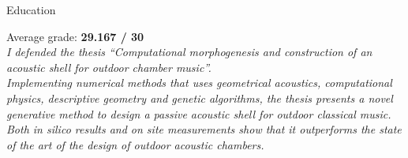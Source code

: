 \documentclass{resume}
\begin{document}
\begin{rSection}{Education}
\begin{enumerate}[leftmargin=0.45cm, itemsep=1em, topsep=0.5em, parsep=0.2em]
        Average grade: \textbf{29.167 / 30}
        \vspace{0.5em} \\
        \textit{I defended the thesis “Computational morphogenesis and construction of an acoustic shell for outdoor chamber music”. \\Implementing numerical methods that uses geometrical acoustics, computational physics, descriptive geometry and genetic algorithms, the thesis presents a novel generative method to design a passive acoustic shell for outdoor classical music. Both in silico results and on site measurements show that it outperforms the state of the art of the design of outdoor acoustic chambers.}
    \end{enumerate}
\end{rSection}

\end{document}
